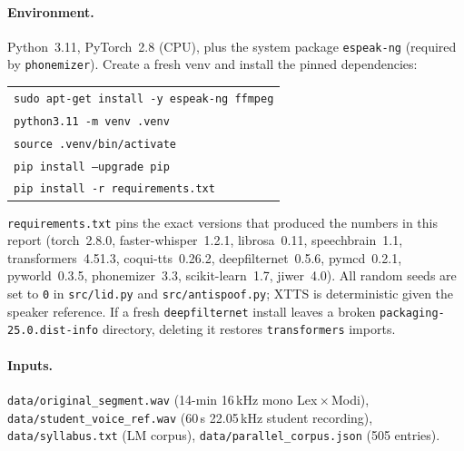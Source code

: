 \documentclass[conference]{IEEEtran}
\begin{document}
\paragraph*{Environment.} Python~3.11, PyTorch~2.8 (CPU), plus the system
package \texttt{espeak-ng} (required by \texttt{phonemizer}). Create a
fresh venv and install the pinned dependencies:

\begin{center}\scriptsize
\begin{tabular}{@{}l@{}}
\texttt{sudo apt-get install -y espeak-ng ffmpeg} \\
\texttt{python3.11 -m venv .venv} \\
\texttt{source .venv/bin/activate} \\
\texttt{pip install --upgrade pip} \\
\texttt{pip install -r requirements.txt} \\
\end{tabular}
\end{center}

\noindent\texttt{requirements.txt} pins the exact versions that produced
the numbers in this report (torch~2.8.0, faster-whisper~1.2.1,
librosa~0.11, speechbrain~1.1, transformers~4.51.3, coqui-tts~0.26.2,
deepfilternet~0.5.6, pymcd~0.2.1, pyworld~0.3.5, phonemizer~3.3,
scikit-learn~1.7, jiwer~4.0). All random seeds are set to \texttt{0} in
\texttt{src/lid.py} and \texttt{src/antispoof.py}; XTTS is deterministic
given the speaker reference. If a fresh \texttt{deepfilternet} install
leaves a broken \texttt{packaging-25.0.dist-info} directory, deleting
it restores \texttt{transformers} imports.

\paragraph*{Inputs.} \texttt{data/original\_segment.wav} (14-min 16\,kHz
mono Lex\,$\times$\,Modi), \texttt{data/student\_voice\_ref.wav}
(60\,s 22.05\,kHz student recording), \texttt{data/syllabus.txt} (LM
corpus), \texttt{data/parallel\_corpus.json} (505 entries).
\end{document}
